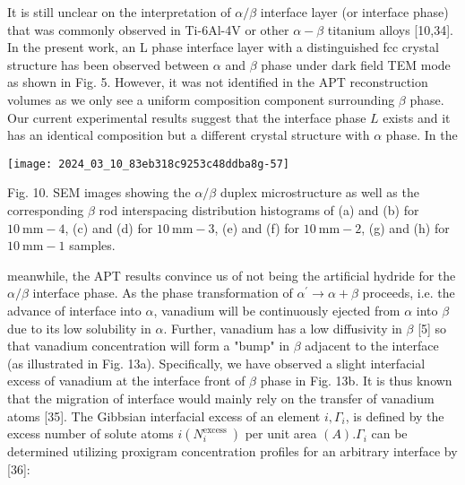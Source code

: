 \documentclass[10pt]{article}
\begin{document}
It is still unclear on the interpretation of $\alpha / \beta$ interface layer (or interface phase) that was commonly observed in Ti-6Al-4V or other $\alpha-\beta$ titanium alloys [10,34]. In the present work, an L phase interface layer with a distinguished fcc crystal structure has been observed between $\alpha$ and $\beta$ phase under dark field TEM mode as shown in Fig. 5. However, it was not identified in the APT reconstruction volumes as we only see a uniform composition component surrounding $\beta$ phase. Our current experimental results suggest that the interface phase $L$ exists and it has an identical composition but a different crystal structure with $\alpha$ phase. In the

\begin{center}
\texttt{[image: 2024\_03\_10\_83eb318c9253c48ddba8g-57]}
\end{center}

Fig. 10. SEM images showing the $\alpha / \beta$ duplex microstructure as well as the corresponding $\beta$ rod interspacing distribution histograms of (a) and (b) for $10 \mathrm{~mm}-4$, (c) and (d) for $10 \mathrm{~mm}-3$, (e) and (f) for $10 \mathrm{~mm}-2$, (g) and (h) for $10 \mathrm{~mm}-1$ samples.

meanwhile, the APT results convince us of not being the artificial hydride for the $\alpha / \beta$ interface phase. As the phase transformation of $\alpha^{\prime} \rightarrow \alpha+\beta$ proceeds, i.e. the advance of interface into $\alpha$, vanadium will be continuously ejected from $\alpha$ into $\beta$ due to its low solubility in $\alpha$. Further, vanadium has a low diffusivity in $\beta$ [5] so that vanadium concentration will form a "bump" in $\beta$ adjacent to the interface (as illustrated in Fig. 13a). Specifically, we have observed a slight interfacial excess of vanadium at the interface front of $\beta$ phase in Fig. 13b. It is thus known that the migration of interface would mainly rely on the transfer of vanadium atoms [35]. The Gibbsian interfacial excess of an element $i, \Gamma_{i}$, is defined by the excess number of solute atoms $i\left(N_{i}^{\text {excess }}\right)$ per unit area $(A) . \Gamma_{i}$ can be determined utilizing proxigram concentration profiles for an arbitrary interface by [36]:
\end{document}

